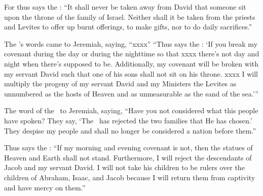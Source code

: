 \begin{inparaenum}
   For thus says the \lord: ``It shall never be taken away from David that someone sit upon the throne of the family of Israel.%
   Neither shall it be taken from the priests and Levites to offer up burnt offerings, to make gifts, nor to do daily sacrifices.''%
  
   The \lord's words came to Jeremiah, saying, ``xxxx''%
   ``Thus says the \lord: `If you break my covenant during the day or during the nighttime so that xxxx there's not day and night when there's supposed to be.%
   Additionally, my covenant will be broken with my servant David such that one of his sons shall not sit on his throne. xxxx%
   I will multiply the progeny of my servant David and my Ministers the Levites as unnumbered as the hosts of Heaven and as unmeasurable as the sand of the sea.'\thinspace''%
  
   The word of the \lord\ to Jeremiah, saying,%
   ``Have you not considered what this people have spoken? They say, `The \lord\ has rejected the two families that He has chosen.' They despise my people and shall no longer be considered a nation before them.''%
  
   Thus says the \lord: ``If my morning and evening covenant is not, then the statues of Heaven and Earth shall not stand.%
   Furthermore, I will reject the descendants of Jacob and my servant David. I will not take his children to be rulers over the children of Abraham, Isaac, and Jacob because I will return them from captivity and have mercy on them.''%
\end{inparaenum}
